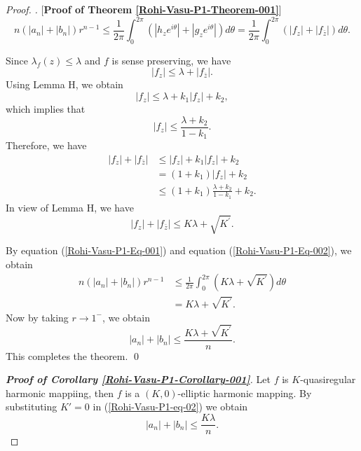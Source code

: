 \documentclass[a4paper,12pt]{amsart}
\theoremstyle{plain}
\theoremstyle{definition}
\newenvironment{pf}[1][]{%
	\vskip 3mm
	\noindent
	\ifthenelse{\equal{#1}{}}%
	{{\slshape Proof. }}%
	{{\slshape #1.} }%
}%
{\qed\bigskip}
\begin{document}
\begin{pf} [{\bf Proof of Theorem   \ref{Rohi-Vasu-P1-Theorem-001}}]
\begin{equation}\label{Rohi-Vasu-P1-Eq-001}
n\left(\left|a_n\right|+\left|b_n\right|\right) r^{n-1}  \leq \frac{1}{2 \pi} \int_0^{2 \pi}\left(\left|h_z e^{i \theta}\right|+\left|g_z e^{i \theta}\right|\right) d \theta 
=\frac{1}{2 \pi} \int_0^{2 \pi}\left(\left|f_z\right|+\left|f_{\bar{z}}\right|\right) d \theta. 
\end{equation}

 Since $\lambda_f(z) \leq \lambda$ and $f$ is sense preserving, we have
$$
\left|f_z\right| \leq \lambda+\left|f_{\bar{z}}\right|.$$
Using Lemma H, we obtain
$$
\left|f_z\right| \leq \lambda+k_1\left|f_z\right|+k_2,
$$
which implies that
$$
\left|f_z\right| \leq \frac{\lambda
+k_2}{1-k_1}.
$$
Therefore, we have 
$$
\begin{aligned}
|f_z|+|f_{\bar{z}}| & \leq |f_z|+k_1|f_z|+k_2 \\
&=\left(1+k_1\right)\left|f_z\right|+k_2 \\
& \leq\left(1+k_1\right) \frac{\lambda+k_2}{1-k_1}+k_2.
\end{aligned}
$$
In view of Lemma H, we have 
\begin{equation}\label{Rohi-Vasu-P1-Eq-002}
|f_z|+|f_{\bar{z}}| \leq K \lambda+\sqrt{K^{\prime}}.
\end{equation}

By equation (\ref{Rohi-Vasu-P1-Eq-001}) and equation (\ref{Rohi-Vasu-P1-Eq-002}), we obtain
$$
\begin{aligned}
n\left(\left|a_n\right|+\left|b_n\right|\right) r^{n-1} & \leq \frac{1}{2 \pi} \int_0^{2 \pi}\left(K \lambda+\sqrt{K^{\prime}}\right) d \theta \\
&=K \lambda+\sqrt{K^{\prime}}.
\end{aligned}
$$
Now by taking $r \rightarrow 1^{-}$, we obtain
$$
\left|a_n\right|+\left|b_n\right| \leq \frac{K \lambda+\sqrt{K^{\prime}}}{n}.
$$
This completes the theorem.
\end{pf}

\begin{proof}[{\bf Proof of Corollary   \ref{Rohi-Vasu-P1-Corollary-001}}]
Let $f$ is $K$-quasiregular harmonic mappiing, then $f$ is a $(K,0)$-elliptic harmonic mapping. By substituting $K'=0$ in (\ref{Rohi-Vasu-P1-eq-02}) we obtain $$\left|a_n\right|+\left|b_n\right| \leq \frac{K \lambda}{n}.$$
\end{proof}
\end{document}

